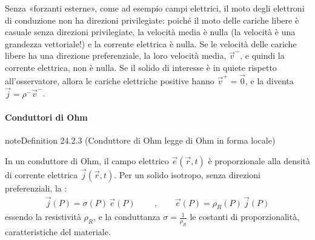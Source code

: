 \documentclass[letterpaper,10pt,italian]{jupyterBook}
\begin{document}
\sphinxAtStartPar
Senza «forzanti esterne», come ad esempio campi elettrici, il moto degli elettroni di conduzione non ha direzioni privilegiate: poiché il moto delle cariche libere è casuale senza direzioni privilegiate, la velocità media è nulla (la velocità è una grandezza vettoriale!) e la corrente elettrica è nulla. Se le velocità delle cariche libere ha una direzione preferenziale, la loro velocità media, \(\vec{v}^-\), e quindi la corrente elettrica, non è nulla. Se il solido di interesse è in quiete rispetto all’osservatore, allora le cariche elettriche positive hanno \(\vec{v}^+ = \vec{0}\), e la {\hyperref[\detokenize{ch/electromagnetism/electric-current:electric-current-density-def}]{}} diventa \(\vec{j} = \rho^- \vec{v}^-\).




\paragraph{Conduttori di Ohm}
\label{\detokenize{ch/electromagnetism/electric-current:conduttori-di-ohm}}\label{\detokenize{ch/electromagnetism/electric-current:physics-hs-electromagnetism-electric-current-solids-conductor-ohm}}\label{ch/electromagnetism/electric-current:ohm-local}
\begin{sphinxadmonition}{note}{Definition 24.2.3 (Conduttore di Ohm \sphinxhyphen{} legge di Ohm in forma locale)}



\sphinxAtStartPar
In un conduttore di Ohm, il campo elettrico \(\vec{e}(\vec{r},t)\) è proporzionale alla densità di corrente elettrica \(\vec{j}(\vec{r},t)\). Per un solido isotropo, senza direzioni preferenziali, la :
\begin{equation}\label{equation:ch/electromagnetism/electric-current:ohm:local}
\begin{split}
\vec{j}(P) = \sigma(P) \, \vec{e}(P)
\qquad \ , \qquad
\vec{e}(P) = \rho_R(P) \, \vec{j}(P)
\end{split}
\end{equation}
\sphinxAtStartPar
essendo la resistività \(\rho_R\), e la conduttanza \(\sigma = \frac{1}{\rho_R}\) le costanti di proporzionalità, caratteristiche del materiale.
\end{sphinxadmonition}
\end{document}
